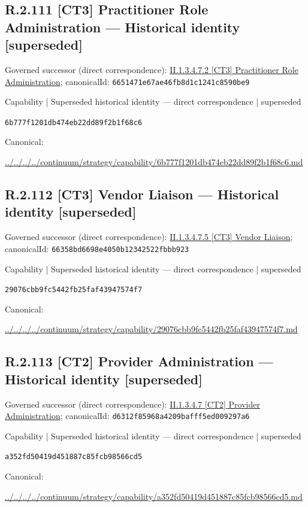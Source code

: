\documentclass[10pt,a4paper]{article}
\begin{document}
\subsection*{R.2.111 [CT3] Practitioner Role Administration — Historical identity [superseded]}
Governed successor (direct correspondence): \hyperref[element-6651471e67ae46fb8d1c1241c8590be9]{II.1.3.4.7.2 [CT3] Practitioner Role Administration}; canonicalId: \texttt{6651471e67ae46fb8d1c1241c8590be9}\par
\label{element-6b777f1201db474eb22dd89f2b1f68c6}
{\small Capability | Superseded historical identity — direct correspondence | superseded}\par
\texttt{6b777f1201db474eb22dd89f2b1f68c6}\par
Canonical: \par
{\footnotesize\url{../../../../continuum/strategy/capability/6b777f1201db474eb22dd89f2b1f68c6.md}}\par
\subsection*{R.2.112 [CT3] Vendor Liaison — Historical identity [superseded]}
Governed successor (direct correspondence): \hyperref[element-66358bd6698e4050b12342522fbbb923]{II.1.3.4.7.5 [CT3] Vendor Liaison}; canonicalId: \texttt{66358bd6698e4050b12342522fbbb923}\par
\label{element-29076cbb9fc5442fb25faf43947574f7}
{\small Capability | Superseded historical identity — direct correspondence | superseded}\par
\texttt{29076cbb9fc5442fb25faf43947574f7}\par
Canonical: \par
{\footnotesize\url{../../../../continuum/strategy/capability/29076cbb9fc5442fb25faf43947574f7.md}}\par
\subsection*{R.2.113 [CT2] Provider Administration — Historical identity [superseded]}
Governed successor (direct correspondence): \hyperref[element-d6312f85968a4209bafff5ed009297a6]{II.1.3.4.7 [CT2] Provider Administration}; canonicalId: \texttt{d6312f85968a4209bafff5ed009297a6}\par
\label{element-a352fd50419d451887c85fcb98566cd5}
{\small Capability | Superseded historical identity — direct correspondence | superseded}\par
\texttt{a352fd50419d451887c85fcb98566cd5}\par
Canonical: \par
{\footnotesize\url{../../../../continuum/strategy/capability/a352fd50419d451887c85fcb98566cd5.md}}\par
\end{document}
